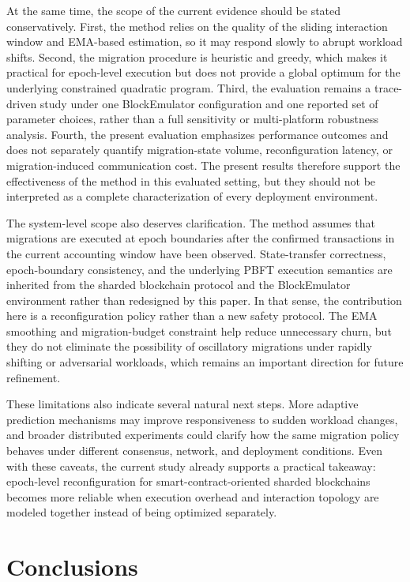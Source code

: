 \documentclass{article}
\begin{document}
At the same time, the scope of the current evidence should be stated conservatively. First, the method relies on the quality of the sliding interaction window and EMA-based estimation, so it may respond slowly to abrupt workload shifts. Second, the migration procedure is heuristic and greedy, which makes it practical for epoch-level execution but does not provide a global optimum for the underlying constrained quadratic program. Third, the evaluation remains a trace-driven study under one BlockEmulator configuration and one reported set of parameter choices, rather than a full sensitivity or multi-platform robustness analysis. Fourth, the present evaluation emphasizes performance outcomes and does not separately quantify migration-state volume, reconfiguration latency, or migration-induced communication cost. The present results therefore support the effectiveness of the method in this evaluated setting, but they should not be interpreted as a complete characterization of every deployment environment.

The system-level scope also deserves clarification. The method assumes that migrations are executed at epoch boundaries after the confirmed transactions in the current accounting window have been observed. State-transfer correctness, epoch-boundary consistency, and the underlying PBFT execution semantics are inherited from the sharded blockchain protocol and the BlockEmulator environment rather than redesigned by this paper. In that sense, the contribution here is a reconfiguration policy rather than a new safety protocol. The EMA smoothing and migration-budget constraint help reduce unnecessary churn, but they do not eliminate the possibility of oscillatory migrations under rapidly shifting or adversarial workloads, which remains an important direction for future refinement.

These limitations also indicate several natural next steps. More adaptive prediction mechanisms may improve responsiveness to sudden workload changes, and broader distributed experiments could clarify how the same migration policy behaves under different consensus, network, and deployment conditions. Even with these caveats, the current study already supports a practical takeaway: epoch-level reconfiguration for smart-contract-oriented sharded blockchains becomes more reliable when execution overhead and interaction topology are modeled together instead of being optimized separately.

\section{Conclusions}\label{sec:conclusions}
\end{document}
